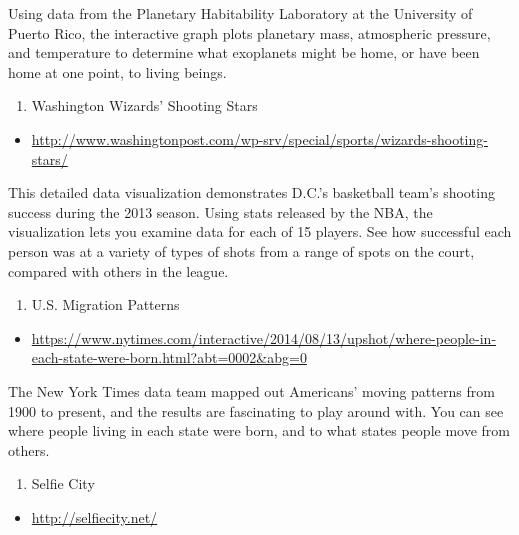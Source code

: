 \documentclass[]{book}
\providecommand{\tightlist}{%
  \setlength{\itemsep}{0pt}\setlength{\parskip}{0pt}}
\theoremstyle{definition}
\theoremstyle{definition}
\theoremstyle{definition}
\theoremstyle{remark}
\begin{document}
Using data from the Planetary Habitability Laboratory at the University
of Puerto Rico, the interactive graph plots planetary mass, atmospheric
pressure, and temperature to determine what exoplanets might be home, or
have been home at one point, to living beings.

\begin{enumerate}
\def\labelenumi{\arabic{enumi}.}
\setcounter{enumi}{10}
\tightlist
\item
  Washington Wizards' Shooting Stars
\end{enumerate}

\begin{itemize}
\tightlist
\item
  \url{http://www.washingtonpost.com/wp-srv/special/sports/wizards-shooting-stars/}
\end{itemize}

This detailed data visualization demonstrates D.C.'s basketball team's
shooting success during the 2013 season. Using stats released by the
NBA, the visualization lets you examine data for each of 15 players. See
how successful each person was at a variety of types of shots from a
range of spots on the court, compared with others in the league.

\begin{enumerate}
\def\labelenumi{\arabic{enumi}.}
\setcounter{enumi}{11}
\tightlist
\item
  U.S. Migration Patterns
\end{enumerate}

\begin{itemize}
\tightlist
\item
  \url{https://www.nytimes.com/interactive/2014/08/13/upshot/where-people-in-each-state-were-born.html?abt=0002\&abg=0}
\end{itemize}

The New York Times data team mapped out Americans' moving patterns from
1900 to present, and the results are fascinating to play around with.
You can see where people living in each state were born, and to what
states people move from others.

\begin{enumerate}
\def\labelenumi{\arabic{enumi}.}
\setcounter{enumi}{12}
\tightlist
\item
  Selfie City
\end{enumerate}

\begin{itemize}
\tightlist
\item
  \url{http://selfiecity.net/}
\end{itemize}
\end{document}
